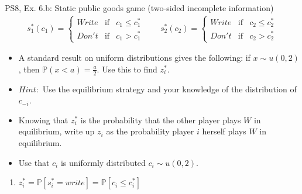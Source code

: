 \begin{frame}{PS8, Ex. 6.b: Static public goods game (two-sided incomplete information)}
    \begin{align*}
      s_1^*(c_1)=\left\{\begin{array}{rcl}
        Write & \text{if} & c_1\leq c_1^*\\
        Don't & \text{if} & c_1>c_1^*
        \end{array}\right.\quad\quad
      s_2^*(c_2)=\left\{\begin{array}{rcl}
        Write & \text{if} & c_2\leq c_2^*\\
        Don't & \text{if} & c_2>c_2^*
        \end{array}\right.
    \end{align*}
    \vspace{-12pt}
    \begin{itemize}
      \item[(b)] A standard result on uniform distributions gives the following: if $x\sim u(0, 2)$, then $\mathbb{P}(x<a)=\frac{a}{2}$. Use this to find $z_i^*$.
      \item[]    $Hint:$ Use the equilibrium strategy and your knowledge of the distribution of $c_{-i}$.
    \end{itemize}
    \begin{multicols}{2}
      \begin{itemize}
        \item[Step 1:] Knowing that $z_i^*$ is the probability that the other player plays $W$ in equilibrium, write up $z_i$ as the probability player $i$ herself plays $W$ in equilibrium.
        \item[Step 2:] Use that $c_i$ is uniformly distributed $c_i\sim u(0, 2)$.
      \end{itemize}
      \vfill\null\columnbreak
      \begin{enumerate}
        \item $z_i^*=\mathbb{P}[s_i^*=write]=\mathbb{P}[c_i\leq c_i^*]$
      \end{enumerate}
      \vfill\null
    \end{multicols}
\end{frame}
